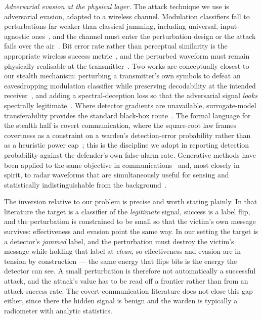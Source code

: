 \textit{Adversarial evasion at the physical layer.}
The attack technique we use is adversarial evasion, adapted to a wireless channel.
Modulation classifiers fall to perturbations far weaker than classical jamming, including universal, input-agnostic ones~\cite{sadeghi2019adversarial}, and the channel must enter the perturbation design or the attack fails over the air~\cite{kim2022channel}.
Bit error rate rather than perceptual similarity is the appropriate wireless success metric~\cite{flowers2020evaluating}, and the perturbed waveform must remain physically realisable at the transmitter~\cite{restuccia2022generalized}.
Two works are conceptually closest to our stealth mechanism: perturbing a transmitter's own symbols to defeat an eavesdropping modulation classifier while preserving decodability at the intended receiver~\cite{hameed2021offense}, and adding a spectral-deception loss so that the adversarial signal \emph{looks} spectrally legitimate~\cite{delvecchio2020spectral}.
Where detector gradients are unavailable, surrogate-model transferability provides the standard black-box route~\cite{papernot2017practical}.
The formal language for the stealth half is covert communication, where the square-root law frames covertness as a constraint on a warden's detection-error probability rather than as a heuristic power cap~\cite{bash2013limits}; this is the discipline we adopt in reporting detection probability against the defender's own false-alarm rate.
Generative methods have been applied to the same objective in communications~\cite{sagduyu2021gan,wen2025generative} and, most closely in spirit, to radar waveforms that are simultaneously useful for sensing and statistically indistinguishable from the background~\cite{ziemann2025lpd}.

The inversion relative to our problem is precise and worth stating plainly.
In that literature the target is a classifier of the \emph{legitimate} signal, success is a label flip, and the perturbation is constrained to be small so that the victim's own message survives: effectiveness and evasion point the same way.
In our setting the target is a detector's \emph{jammed} label, and the perturbation must destroy the victim's message while holding that label at \emph{clean}, so effectiveness and evasion are in tension by construction --- the same energy that flips bits is the energy the detector can see.
A small perturbation is therefore not automatically a successful attack, and the attack's value has to be read off a frontier rather than from an attack-success rate.
The covert-communication literature does not close this gap either, since there the hidden signal is benign and the warden is typically a radiometer with analytic statistics.

